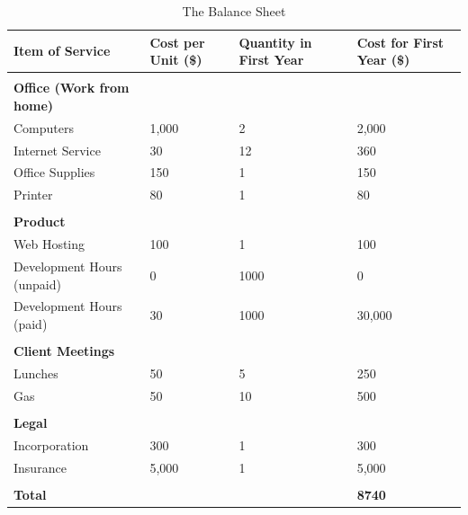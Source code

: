 \begin{table}[ht]
\caption{The Balance Sheet} %
\centering %
\begin{tabular}{| l | p{1in} | p{1in} | p{1in} |} %
\hline
{\bf Item of Service} & {\bf Cost per Unit  (\$)} &  {\bf Quantity in First Year } &  {\bf Cost for First Year (\$) } \\
\hline
 &   &   &   \\
{\bf Office (Work from home)} & & & \\
	Computers & 1,000 & 2 & 2,000 \\
	Internet Service & 30 & 12 & 360 \\
	Office Supplies & 150 & 1 & 150 \\
	Printer & 80 & 1 & 80 \\
 &   &   &   \\
{\bf Product} &   &   &   \\
	Web Hosting & 100 & 1 & 100 \\
	Development Hours (unpaid) & 0 & 1000 & 0 \\
	Development Hours (paid) & 30 & 1000 & 30,000 \\
  &   &   &   \\
{\bf Client Meetings} &   &   &   \\
	Lunches & 50 &  5 & 250\\
	Gas & 50 & 10 & 500 \\
  &   &   &   \\
{\bf Legal} &   &   &   \\
	Incorporation & 300 &  1 & 300\\
	Insurance & 5,000 & 1 & 5,000 \\
 &   &  &   \\ 
{\bf Total} &   &   & {\bf 8740} \\

\hline
\end{tabular}
\label{balanceSheet} %
\end{table}
